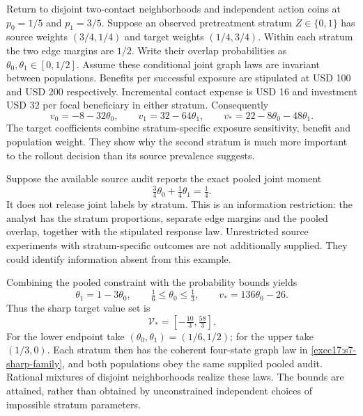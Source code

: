 Return to disjoint two-contact neighborhoods and independent action coins at
$p_0=1/5$ and $p_1=3/5$. Suppose an observed pretreatment stratum $Z\in\{0,1\}$
has source weights $(3/4,1/4)$ and target weights $(1/4,3/4)$. Within each
stratum the two edge margins are $1/2$. Write their overlap probabilities
as $\theta_0,\theta_1\in[0,1/2]$. Assume these conditional joint graph laws
are invariant between populations. Benefits per successful exposure are
stipulated at USD 100 and USD 200 respectively. Incremental contact expense
is USD 16 and investment USD 32 per focal beneficiary in either stratum.
Consequently
\begin{equation}
 v_0=-8-32\theta_0,\qquad v_1=32-64\theta_1,
 \qquad v_*=22-8\theta_0-48\theta_1.
 \label{exec17:s7-stratum-values}
\end{equation}
The target coefficients combine stratum-specific exposure sensitivity,
benefit and population weight. They show why the second stratum is much more
important to the rollout decision than its source prevalence suggests.

Suppose the available source audit reports the exact pooled joint moment
\begin{equation}
 \tfrac34\theta_0+\tfrac14\theta_1=\tfrac14.
 \label{exec17:s7-pooled-constraint}
\end{equation}
It does not release joint labels by stratum. This is an information restriction:
the analyst has the stratum proportions, separate edge margins and the pooled
overlap, together with the stipulated response law. Unrestricted source
experiments with stratum-specific outcomes are not additionally supplied.
They could identify information absent from this example.

Combining the pooled constraint with the probability bounds yields
\begin{equation}
 \theta_1=1-3\theta_0,\qquad
 \tfrac16\leq\theta_0\leq\tfrac13,
 \qquad v_*=136\theta_0-26.
 \label{exec17:s7-pooled-reduction}
\end{equation}
Thus the sharp target value set is
\begin{equation}
 \mathcal V_*=[-\tfrac{10}{3},\tfrac{58}{3}].
 \label{exec17:s7-pooled-set}
\end{equation}
For the lower endpoint take $(\theta_0,\theta_1)=(1/6,1/2)$; for the upper
take $(1/3,0)$. Each stratum then has the coherent four-state graph law in
\eqref{exec17:s7-sharp-family}, and both populations obey the same supplied
pooled audit. Rational mixtures of disjoint neighborhoods realize these laws.
The bounds are attained, rather than obtained by unconstrained independent
choices of impossible stratum parameters.~\citep{exec17_s7_math}

